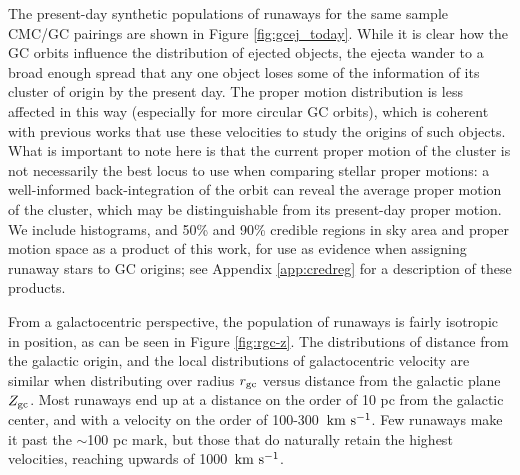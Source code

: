 \documentclass[twocolumn]{aastex631}
\newcommand{\kms}{${\rm km~s^{-1}}$}
\begin{document}
The present-day synthetic populations of runaways for the same sample CMC/GC pairings are shown in Figure \ref{fig:gcej_today}.
While it is clear how the GC orbits influence the distribution of ejected objects, the ejecta wander to a broad enough spread that any one object loses some of the information of its cluster of origin by the present day.
The proper motion distribution is less affected in this way (especially for more circular GC orbits), which is coherent with previous works that use these velocities to study the origins of such objects.
What is important to note here is that the current proper motion of the cluster is not necessarily the best locus to use when comparing stellar proper motions: a well-informed back-integration of the orbit can reveal the average proper motion of the cluster, which may be distinguishable from its present-day proper motion.
We include histograms, and 50\% and 90\% credible regions in sky area and proper motion space as a product of this work, for use as evidence when assigning runaway stars to GC origins; see Appendix \ref{app:credreg} for a description of these products.

\begin{figure*}
    \caption{
        Present-day positions (galactic longitude/latitude) and velocities (projected onto the galactic longitude/latitude directions) for the runaway objects from the sample GCs.
        The color scale is the same as in Figure \ref{fig:gc_orbit_ejections}, depicting the eject masses.
        The back-integrated orbits are shown as the gray trajectories, and the blue "x" is the position/velocity of the GC as measured by \citet{2018MNRAS.478.1520B}.
        The set of synthetic ejecta shown here is the result of downsampling the total set by a factor of ten, to account for the repeated-realizations method described in \S\ref{sec:methods}. 
    }
    \label{fig:gcej_today}
\end{figure*}

From a galactocentric perspective, the population of runaways is fairly isotropic in position, as can be seen in Figure \ref{fig:rgc-z}.
The distributions of distance from the galactic origin, and the local distributions of galactocentric velocity are similar when distributing over radius $r_{\rm gc}$ versus distance from the galactic plane $Z_{\rm gc}$.
Most runaways end up at a distance on the order of 10 pc from the galactic center, and with a velocity on the order of 100-300~\kms.
Few runaways make it past the $\sim$100 pc mark, but those that do naturally retain the highest velocities, reaching upwards of 1000~\kms.
\end{document}
